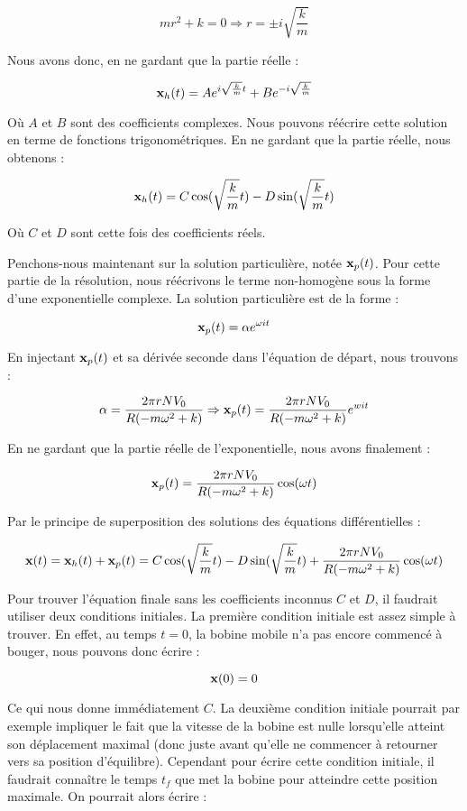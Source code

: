 $$mr^2 + k = 0 \Rightarrow r = \pm i\sqrt{\frac{k}{m}}$$

Nous avons donc, en ne gardant que la partie réelle :

$${\bf x}_h(t) = Ae^{i\sqrt{\frac{k}{m}}t} + Be^{-i\sqrt{\frac{k}{m}}}$$

Où $A$ et $B$ sont des coefficients complexes. Nous pouvons réécrire cette solution
en terme de fonctions trigonométriques. En ne gardant que la partie réelle, 
nous obtenons :

$${\bf x}_h(t) = C\cos(\sqrt{\frac{k}{m}}t) - D\sin(\sqrt{\frac{k}{m}}t)$$

Où $C$ et $D$ sont cette fois des coefficients réels.

Penchons-nous maintenant sur la solution particulière, notée ${\bf x}_p(t)$. Pour
cette partie de la résolution, nous réécrivons le terme non-homogène sous la forme d'une
exponentielle complexe. La solution particulière est de la forme :

$${\bf x}_p(t) = \alpha e^{\omega it}$$

En injectant ${\bf x}_p(t)$ et sa dérivée seconde dans l'équation de départ, nous trouvons :

$$\alpha = \frac{2\pi rNV_0}{R(-m\omega^2 + k)} \Rightarrow {\bf x}_p(t) = \frac{2\pi rNV_0}{R(-m\omega^2 + k)}e^{wit}$$

En ne gardant que la partie réelle de l'exponentielle, nous avons finalement :

$${\bf x}_p(t) = \frac{2\pi rNV_0}{R(-m\omega^2 + k)} \cos (\omega t)$$

Par le principe de superposition des solutions des équations différentielles :

$${\bf x}(t) = {\bf x}_h(t) + {\bf x}_p(t) = C\cos(\sqrt{\frac{k}{m}}t) - D\sin(\sqrt{\frac{k}{m}}t) + \frac{2\pi rNV_0}{R(-m\omega^2 + k)} \cos (\omega t)$$

Pour trouver l'équation finale sans les coefficients inconnus $C$ et $D$, il faudrait utiliser deux conditions
initiales. La première condition initiale est assez simple à trouver. En effet, au temps $t=0$, la bobine
mobile n'a pas encore commencé à bouger, nous pouvons donc écrire :

$${\bf x}(0) = 0$$

Ce qui nous donne immédiatement $C$. La deuxième condition initiale pourrait par exemple impliquer le fait
que la vitesse de la bobine est nulle lorsqu'elle atteint son déplacement maximal (donc juste avant qu'elle ne 
commencer à retourner vers sa position d'équilibre). Cependant pour écrire cette condition initiale, il faudrait
connaître le temps $t_f$ que met la bobine pour atteindre cette position maximale. On pourrait alors écrire :

